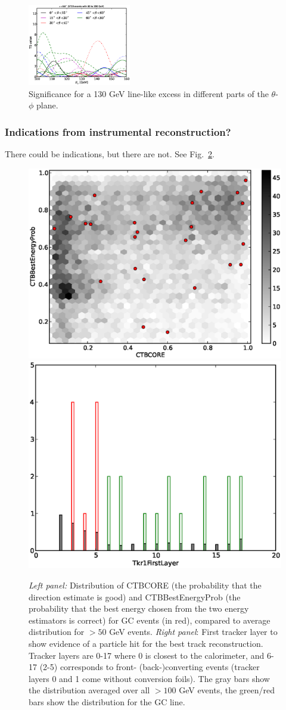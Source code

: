 \documentclass[aps,twocolumn,prd,superscriptaddress,showpacs,nofootinbib,fixfloat]{revtex4}
\begin{document}
\begin{figure}[p]
  \includegraphics[width=0.40\textwidth]{plots/scan_z.LE.100.eps}
  \caption{Significance for a 130 GeV line-like excess in different parts of
  the $\theta$-$\phi$ plane.}
  \label{fig:polarPlotsAll}
\end{figure}

\subsubsection{Indications from instrumental reconstruction?}
There could be indications, but there are not. See Fig.~\ref{fig:CTBquality}.

\begin{figure}
  \centering
  \includegraphics[width=0.48\linewidth]{plots/CTBCORE_CTBBestEnergyProb.eps}
  \includegraphics[width=0.48\linewidth]{plots/Tkr1FirstLayer.eps}
  \caption{\emph{Left panel:} Distribution of CTBCORE (the probability that
  the direction estimate is good) and CTBBestEnergyProb (the probability that
  the best energy chosen from the two energy estimators is correct) for GC
  events (in red), compared to average distribution for $>50$ GeV events.
  \emph{Right panel}: First tracker layer to show evidence of a particle hit
  for the best track reconstruction. Tracker layers are 0-17 where 0 is
  closest to the calorimeter, and 6-17 (2-5) corresponds to front-
  (back-)converting events (tracker layers 0 and 1 come without conversion
  foils). The gray bars show the distribution averaged over all $>100$ GeV
  events, the green/red bars show the distribution for the GC line.}
  \label{fig:CTBquality}
\end{figure}
\end{document}
